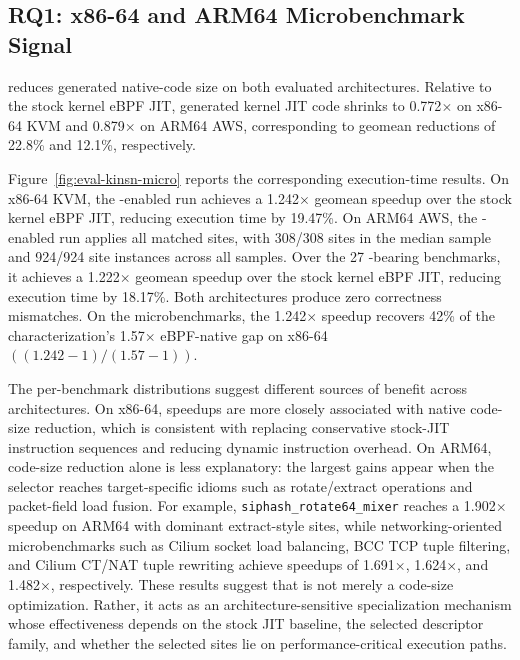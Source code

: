 \subsection{RQ1: x86-64 and ARM64 Microbenchmark Signal}
\label{subsec:micro_benchmark}



\lang reduces generated native-code size on both evaluated architectures. Relative to the stock kernel eBPF JIT, generated kernel JIT code shrinks to 0.772$\times$ on x86-64 KVM and 0.879$\times$ on ARM64 AWS, corresponding to geomean reductions of 22.8\% and 12.1\%, respectively.

Figure~\ref{fig:eval-kinsn-micro} reports the corresponding execution-time results. On x86-64 KVM, the \lang-enabled run achieves a 1.242$\times$ geomean speedup over the stock kernel eBPF JIT, reducing execution time by 19.47\%. On ARM64 AWS, the \lang-enabled run applies all matched \lang sites, with 308/308 sites in the median sample and 924/924 site instances across all samples. Over the 27 \lang-bearing benchmarks, it achieves a 1.222$\times$ geomean speedup over the stock kernel eBPF JIT, reducing
execution time by 18.17\%. Both architectures produce zero correctness mismatches. On the microbenchmarks, the 1.242$\times$ speedup recovers 42\% of the characterization's 1.57$\times$ eBPF-native gap on x86-64 $((1.242{-}1)/(1.57{-}1))$.


The per-benchmark distributions suggest different sources of benefit across architectures. On x86-64, speedups are more closely associated with native code-size reduction, which is consistent with \lang replacing conservative stock-JIT instruction sequences and reducing dynamic instruction overhead. On ARM64, code-size reduction alone is less explanatory: the largest gains appear when the selector reaches target-specific idioms such as rotate/extract operations and packet-field load fusion. For example, \texttt{siphash\_rotate64\_\allowbreak mixer} reaches a 1.902$\times$ speedup on ARM64 with dominant extract-style sites, while networking-oriented microbenchmarks such as Cilium socket load balancing, BCC TCP tuple filtering, and Cilium CT/NAT tuple rewriting achieve speedups of 1.691$\times$, 1.624$\times$, and 1.482$\times$, respectively. These results suggest that \lang is not merely a code-size optimization. Rather, it acts as an architecture-sensitive specialization mechanism whose effectiveness depends on the stock JIT baseline, the selected descriptor family, and whether the selected sites lie on performance-critical execution paths.

